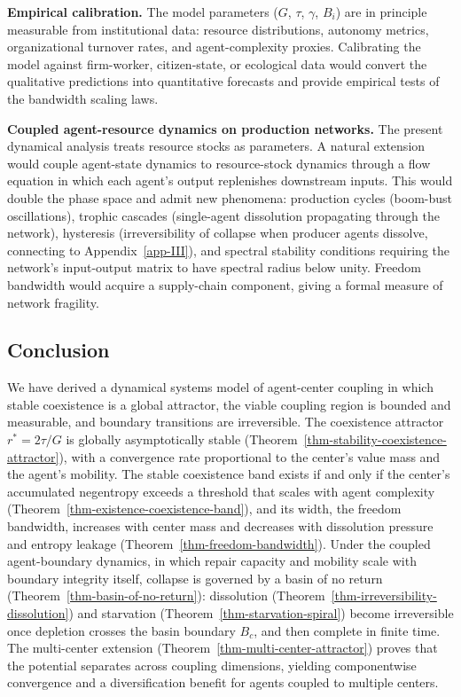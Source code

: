 \documentclass[11pt]{article}
\theoremstyle{plain}
\theoremstyle{definition}
\theoremstyle{remark}
\let\origsubsection\subsection
\renewcommand{\subsection}{\needspace{7\baselineskip}\origsubsection}
\begin{document}
\textbf{Empirical calibration.} The model parameters (\(G\), \(\tau\),
\(\gamma\), \(B_i\)) are in principle measurable from institutional
data: resource distributions, autonomy metrics, organizational turnover
rates, and agent-complexity proxies. Calibrating the model against
firm-worker, citizen-state, or ecological data would convert the
qualitative predictions into quantitative forecasts and provide
empirical tests of the bandwidth scaling laws.

\textbf{Coupled agent-resource dynamics on production networks.} The
present dynamical analysis treats resource stocks as parameters. A
natural extension would couple agent-state dynamics to resource-stock
dynamics through a flow equation in which each agent's output
replenishes downstream inputs. This would double the phase space and
admit new phenomena: production cycles (boom-bust oscillations), trophic
cascades (single-agent dissolution propagating through the network),
hysteresis (irreversibility of collapse when producer agents dissolve,
connecting to Appendix~\ref{app-III}), and spectral stability conditions
requiring the network's input-output matrix to have spectral radius
below unity. Freedom bandwidth would acquire a supply-chain component,
giving a formal measure of network fragility.

\subsection{Conclusion}\label{conclusion-5}

We have derived a dynamical systems model of agent-center coupling in
which stable coexistence is a global attractor, the viable coupling
region is bounded and measurable, and boundary transitions are
irreversible. The coexistence attractor \(r^* = 2\tau/G\) is globally
asymptotically stable
(Theorem~\ref{thm-stability-coexistence-attractor}), with a convergence
rate proportional to the center's value mass and the agent's mobility.
The stable coexistence band exists if and only if the center's
accumulated negentropy exceeds a threshold that scales with agent
complexity (Theorem~\ref{thm-existence-coexistence-band}), and its
width, the freedom bandwidth, increases with center mass and decreases
with dissolution pressure and entropy leakage
(Theorem~\ref{thm-freedom-bandwidth}). Under the coupled agent-boundary
dynamics, in which repair capacity and mobility scale with boundary
integrity itself, collapse is governed by a basin of no return
(Theorem~\ref{thm-basin-of-no-return}): dissolution
(Theorem~\ref{thm-irreversibility-dissolution}) and starvation
(Theorem~\ref{thm-starvation-spiral}) become irreversible once depletion
crosses the basin boundary \(B_c\), and then complete in finite time.
The multi-center extension (Theorem~\ref{thm-multi-center-attractor})
proves that the potential separates across coupling dimensions, yielding
componentwise convergence and a diversification benefit for agents
coupled to multiple centers.
\end{document}
